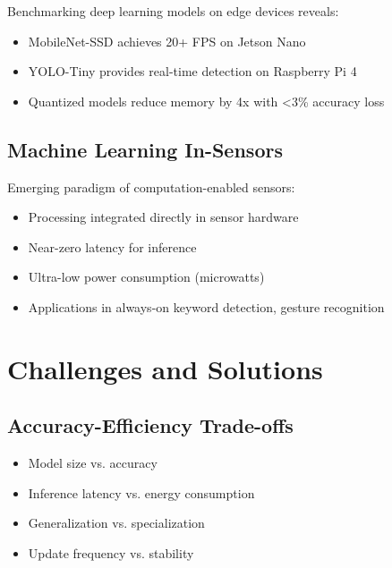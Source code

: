 \documentclass[12pt,a4paper]{article}
\begin{document}
Benchmarking deep learning models on edge devices reveals:
\begin{itemize}
    \item MobileNet-SSD achieves 20+ FPS on Jetson Nano
    \item YOLO-Tiny provides real-time detection on Raspberry Pi 4
    \item Quantized models reduce memory by 4x with <3\% accuracy loss
\end{itemize}

\subsection{Machine Learning In-Sensors}

Emerging paradigm of computation-enabled sensors:
\begin{itemize}
    \item Processing integrated directly in sensor hardware
    \item Near-zero latency for inference
    \item Ultra-low power consumption (microwatts)
    \item Applications in always-on keyword detection, gesture recognition
\end{itemize}

\section{Challenges and Solutions}

\subsection{Accuracy-Efficiency Trade-offs}

\begin{tcolorbox}[colback=edgepurple!10, colframe=edgepurple, title=Key Trade-offs]
\begin{itemize}
    \item Model size vs. accuracy
    \item Inference latency vs. energy consumption
    \item Generalization vs. specialization
    \item Update frequency vs. stability
\end{itemize}
\end{tcolorbox}
\end{document}
